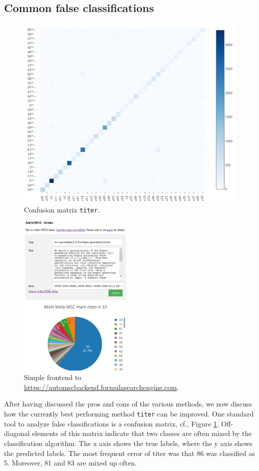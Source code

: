 \subsection{Common false classifications}
\begin{figure}[h]
  \centering
  \includegraphics[width=1.1\textwidth]{confusion.png}
  \caption{Confusion matrix \texttt{titer}.}\label{fgConfusion}
\end{figure}
\begin{figure}
  \begin{center}
    \includegraphics[width=0.48\textwidth]{webFrontend.png}
  \end{center}
  \caption{Simple frontend to \url{https://automscbackend.formulasearchengine.com}.}\label{fgScreenshot}
\end{figure}
After having discussed the pros and cons of the various methods, we now discuss how the currently best performing method \texttt{titer} can be improved. 
One standard tool to analyze false classifications is a confusion matrix, cf., Figure \ref{fgConfusion}.
Off-diagonal elements of this matrix indicate that two classes are often mixed by the classification algorithm.
The x axis shows the true labels, where the y axis shows the predicted labels.
The most frequent error of titer was that 86 was classified as 5.
Moreover, 81 and 83 are mixed up often.


